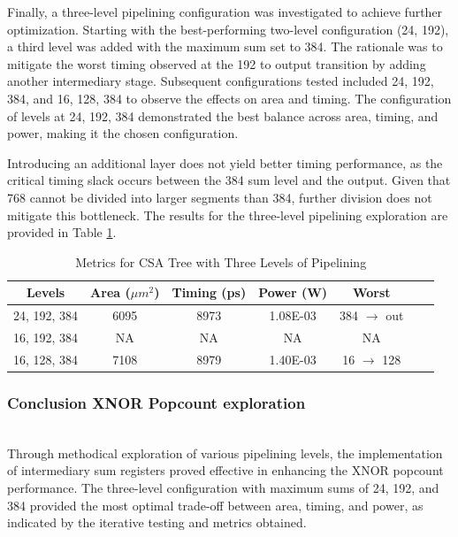 \documentclass[conference]{IEEEtran}
\newcounter{todocount}
\newcommand{\todo}[1]{
  \stepcounter{todocount}
}
\begin{document}
Finally, a three-level pipelining configuration was investigated to achieve further optimization. Starting with the best-performing two-level configuration (24, 192), a third level was added with the maximum sum set to 384. The rationale was to mitigate the worst timing observed at the 192 to output transition by adding another intermediary stage. Subsequent configurations tested included 24, 192, 384, and 16, 128, 384 to observe the effects on area and timing. The configuration of levels at 24, 192, 384 demonstrated the best balance across area, timing, and power, making it the chosen configuration. 

Introducing an additional layer does not yield better timing performance, as the critical timing slack occurs between the 384 sum level and the output. Given that 768 cannot be divided into larger segments than 384, further division does not mitigate this bottleneck. 
The results for the three-level pipelining exploration are provided in Table \ref{tab:three_level}.

\todo{this NA}
\begin{table}[h]
    \centering
    \caption{Metrics for CSA Tree with Three Levels of Pipelining}
    \label{tab:three_level}
    \begin{tabular}{@{}ccccccc@{}}
        \toprule
        \textbf{Levels} & \textbf{Area ($\mu m^2$)} & \textbf{Timing (ps)} & \textbf{Power (W)} & \textbf{Worst} \\
        \midrule
        24, 192, 384 & 6095 & 8973 & 1.08E-03 & 384 $\rightarrow$ out\\
        16, 192, 384 & NA & NA & NA & NA \\
        16, 128, 384 & 7108 & 8979 & 1.40E-03 & 16 $\rightarrow$ 128 \\
        \bottomrule
    \end{tabular}
\end{table}

\subsubsection{Conclusion XNOR Popcount exploration}
\hfill\\

Through methodical exploration of various pipelining levels, the implementation of intermediary sum registers proved effective in enhancing the XNOR popcount performance. The three-level configuration with maximum sums of 24, 192, and 384 provided the most optimal trade-off between area, timing, and power, as indicated by the iterative testing and metrics obtained.
\end{document}
